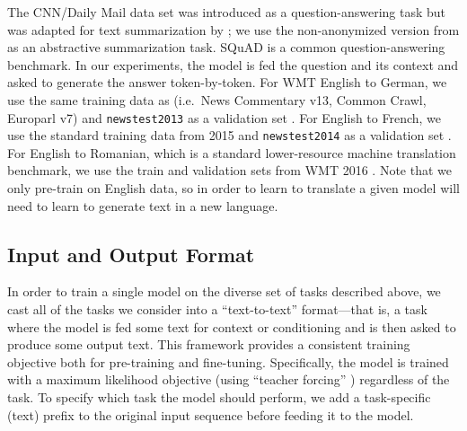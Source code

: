 \documentclass[twoside,11pt]{article}
\begin{document}
The CNN/Daily Mail \citep{hermann2015teaching} data set was introduced as a question-answering task but was adapted for text summarization by  \citet{nallapati2016abstractive}; we use the non-anonymized version from \citet{see2017get} as an abstractive summarization task.
SQuAD \citep{rajpurkar2016squad} is a common question-answering benchmark.
In our experiments, the model is fed the question and its context and asked to generate the answer token-by-token.
For WMT English to German, we use the same training data as \citep{vaswani2017attention} (i.e.\ News Commentary v13, Common Crawl, Europarl v7) and \texttt{newstest2013} as a validation set \citep{bojar2014findings}.
For English to French, we use the standard training data from 2015 and \texttt{newstest2014} as a validation set \citep{bojar2015findings}.
For English to Romanian, which is a standard lower-resource machine translation benchmark, we use the train and validation sets from WMT 2016 \citep{bojar2016findings}.
Note that we only pre-train on English data, so in order to learn to translate a given model will need to learn to generate text in a new language.

\subsection{Input and Output Format}
\label{sec:format}

In order to train a single model on the diverse set of tasks described above, we cast all of the tasks we consider into a ``text-to-text'' format---that is, a task where the model is fed some text for context or conditioning and is then asked to produce some output text.
This framework provides a consistent training objective both for pre-training and fine-tuning.
Specifically, the model is trained with a maximum likelihood objective (using ``teacher forcing'' \citep{williams1989learning}) regardless of the task.
To specify which task the model should perform, we add a task-specific (text) prefix to the original input sequence before feeding it to the model.
\end{document}
